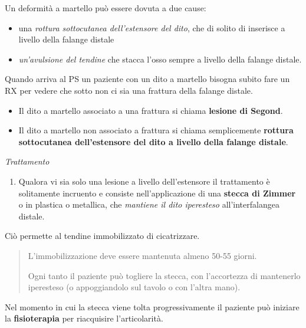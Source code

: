 \documentclass[]{article}
\begin{document}
Un deformità a martello può essere dovuta a due cause:

\begin{itemize}
\item
  una \emph{rottura sottocutanea dell'estensore del dito}, che di solito
  di inserisce a livello della falange distale
\item
  \emph{un'avulsione del tendine} che stacca l'osso sempre a livello
  della falange distale.
\end{itemize}

Quando arriva al PS un paziente con un dito a martello bisogna subito
fare un RX per vedere che sotto non ci sia una frattura della falange
distale.

\begin{itemize}
\item
  Il dito a martello associato a una frattura si chiama \textbf{lesione
  di Segond}.
\end{itemize}

\begin{itemize}
\item
  Il dito a martello non associato a frattura si chiama semplicemente
  \textbf{rottura sottocutanea dell'estensore del dito a livello della
  falange distale}.
\end{itemize}

\emph{Trattamento}

\begin{enumerate}
\def\labelenumi{\arabic{enumi}.}
\item
  Qualora vi sia solo una lesione a livello dell'estensore il
  trattamento è solitamente incruento e consiste nell'applicazione di
  una \textbf{stecca di Zimmer} o in plastica o metallica, che
  \emph{mantiene il dito iperesteso} all'interfalangea distale.
\end{enumerate}

Ciò permette al tendine immobilizzato di cicatrizzare.

\begin{quote}
L'immobilizzazione deve essere mantenuta almeno 50-55 giorni.

Ogni tanto il paziente può togliere la stecca, con l'accortezza di
mantenerlo iperesteso (o appoggiandolo sul tavolo o con l'altra mano).
\end{quote}

Nel momento in cui la stecca viene tolta progressivamente il paziente
può iniziare la \textbf{fisioterapia} per riacquisire l'articolarità.
\end{document}
